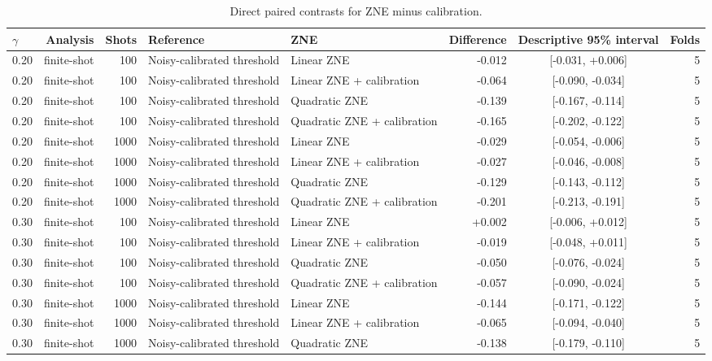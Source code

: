 \documentclass[10pt]{article}
\begin{document}
\begin{table}[H]
\centering
\caption{Direct paired contrasts for ZNE minus calibration.}
\label{tab:paired}
\scriptsize
\begin{tabular}{@{}l r r l l r c r@{}}
\toprule
$\gamma$ & Analysis & Shots & Reference & ZNE & Difference & Descriptive 95\% interval & Folds \\
\midrule
0.20 & finite-shot & 100 & Noisy-calibrated threshold & Linear ZNE & -0.012 & [-0.031, +0.006] & 5 \\
0.20 & finite-shot & 100 & Noisy-calibrated threshold & Linear ZNE + calibration & -0.064 & [-0.090, -0.034] & 5 \\
0.20 & finite-shot & 100 & Noisy-calibrated threshold & Quadratic ZNE & -0.139 & [-0.167, -0.114] & 5 \\
0.20 & finite-shot & 100 & Noisy-calibrated threshold & Quadratic ZNE + calibration & -0.165 & [-0.202, -0.122] & 5 \\
0.20 & finite-shot & 1000 & Noisy-calibrated threshold & Linear ZNE & -0.029 & [-0.054, -0.006] & 5 \\
0.20 & finite-shot & 1000 & Noisy-calibrated threshold & Linear ZNE + calibration & -0.027 & [-0.046, -0.008] & 5 \\
0.20 & finite-shot & 1000 & Noisy-calibrated threshold & Quadratic ZNE & -0.129 & [-0.143, -0.112] & 5 \\
0.20 & finite-shot & 1000 & Noisy-calibrated threshold & Quadratic ZNE + calibration & -0.201 & [-0.213, -0.191] & 5 \\
0.30 & finite-shot & 100 & Noisy-calibrated threshold & Linear ZNE & +0.002 & [-0.006, +0.012] & 5 \\
0.30 & finite-shot & 100 & Noisy-calibrated threshold & Linear ZNE + calibration & -0.019 & [-0.048, +0.011] & 5 \\
0.30 & finite-shot & 100 & Noisy-calibrated threshold & Quadratic ZNE & -0.050 & [-0.076, -0.024] & 5 \\
0.30 & finite-shot & 100 & Noisy-calibrated threshold & Quadratic ZNE + calibration & -0.057 & [-0.090, -0.024] & 5 \\
0.30 & finite-shot & 1000 & Noisy-calibrated threshold & Linear ZNE & -0.144 & [-0.171, -0.122] & 5 \\
0.30 & finite-shot & 1000 & Noisy-calibrated threshold & Linear ZNE + calibration & -0.065 & [-0.094, -0.040] & 5 \\
0.30 & finite-shot & 1000 & Noisy-calibrated threshold & Quadratic ZNE & -0.138 & [-0.179, -0.110] & 5 \\

\end{tabular}
\end{table}
\end{document}
